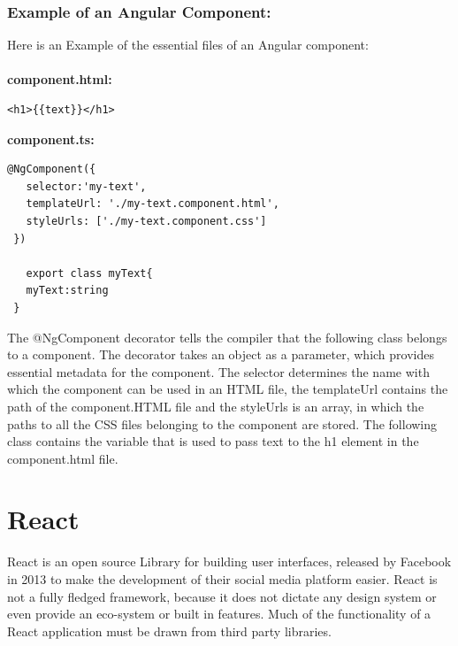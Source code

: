 \subsubsection{Example of an Angular Component:}
Here is an Example of the essential files of an Angular component:\\\\
\textbf{component.html:}
\begin{Verbatim}[frame=single]
 <h1>{{text}}</h1>
\end{Verbatim}
\textbf{component.ts:}
\begin{Verbatim}[frame=single]
 @NgComponent({
   selector:'my-text',
   templateUrl: './my-text.component.html',
   styleUrls: ['./my-text.component.css']
 })
    
   export class myText{
   myText:string
 }
\end{Verbatim}
The @NgComponent decorator tells the compiler that the following class belongs to a component. The decorator takes an object as a parameter, which provides essential metadata for the component. The selector determines the name with which the component can be used in an HTML file, the templateUrl contains the path of the component.HTML file and the styleUrls is an array, in which the paths to all the CSS files belonging to the component are stored. The following class contains the variable that is used to pass text to the h1 element in the component.html file.
\section{React}
React is an open source Library for building user interfaces, released by Facebook in 2013 to make the development of their social media platform easier. React is not a fully fledged framework, because it does not dictate any design system or even provide an eco-system or built in features. Much of the functionality of a React application must be drawn from third party libraries.

